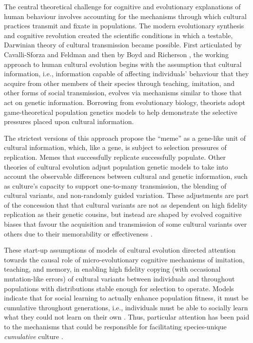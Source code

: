 The central theoretical challenge for cognitive and evolutionary explanations of human behaviour involves accounting for the mechanisms through which cultural practices transmit and fixate in populations. The modern evolutionary synthesis and cognitive revolution created the scientific conditions in which a testable, Darwinian theory of cultural transmission became possible.  First articulated by Cavalli-Sforza and Feldman \textcite{Cavalli-Sforza1981} and then by Boyd and Richerson \textcite{Boyd1988}, the working approach to human cultural evolution begins with the assumption that cultural information, i.e., information capable of affecting individuals' behaviour that they acquire from other members of their species through teaching, imitation, and other forms of social transmission, evolves via mechanisms similar to those that act on genetic information.  Borrowing from evolutionary biology, theorists adopt game-theoretical population genetics models to help demonstrate the selective pressures placed upon cultural information.

The strictest versions of this approach propose the ``meme'' as a gene-like unit of cultural information, which, like a gene, is subject to selection pressures of replication.  Memes that successfully replicate successfully populate\citep{Dawkins1976}. Other theories of cultural evolution adjust population genetic models to take into account the observable differences between cultural and genetic information, such as culture's capacity to support one-to-many transmission, the blending of cultural variants, and non-randomly guided variation.  These adjustments are part of the concession that that cultural variants are not as dependent on high fidelity replication as their genetic cousins, but instead are shaped by evolved cognitive biases that favour the acquisition and transmission of some cultural variants over others due to their memorability or effectiveness \citep{Henrich2007}.

These start-up assumptions of models of cultural evolution directed attention towards the causal role of micro-evolutionary cognitive mechanisms of imitation, teaching, and memory, in enabling high fidelity copying (with occasional mutation-like errors) of cultural variants between individuals and throughout populations with distributions stable enough for selection to operate.  Models indicate that for social learning to actually enhance population fitness, it must be cumulative throughout generations, i.e., individuals must be able to socially learn what they could not learn on their own \citep{Boyd1995}.  Thus, particular attention has been paid to the mechanisms that could be responsible for facilitating species-unique \textit{cumulative} culture \citep{Tomasello2008}.

